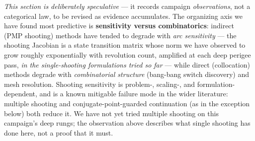 \documentclass[11pt]{article}
\begin{document}
\emph{This section is deliberately speculative} --- it records campaign
\emph{observations}, not a categorical law, to be revised as evidence
accumulates. The organizing axis we have found most predictive is
\textbf{sensitivity versus combinatorics}: indirect (PMP shooting) methods
have tended to degrade with \emph{arc sensitivity} --- the shooting
Jacobian is a state transition matrix whose norm we have observed to grow
roughly exponentially with revolution count, amplified at each deep
perigee pass, \emph{in the single-shooting formulations tried so far} ---
while direct (collocation) methods degrade with \emph{combinatorial
structure} (bang-bang switch discovery) and mesh resolution. Shooting
sensitivity is problem-, scaling-, and formulation-dependent, and is a
known mitigable failure mode in the wider literature: multiple shooting
and conjugate-point-guarded continuation (as in the exception below) both
reduce it. We have not yet tried multiple shooting on this campaign's deep
rungs; the observation above describes what single shooting has done here,
not a proof that it must.
\end{document}
